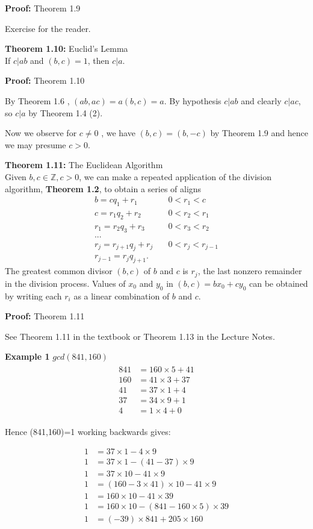 \documentclass[a4paper]{article}
\begin{document}
\textbf{Proof:} Theorem 1.9

Exercise for the reader.

\textbf{Theorem 1.10:} Euclid's Lemma\\
If $c|ab$ and $(b,c)=1$, then $c|a$.

\textbf{Proof:} Theorem 1.10

By Theorem 1.6 , $(ab,ac)=a(b,c)=a$. By hypothesis $c|ab$ and clearly $c|ac$, so $c|a$ by Theorem 1.4 (2).

Now we observe for $c\neq 0$ , we have $(b,c)=(b,-c)$ by Theorem 1.9 and hence we may presume $c>0$.

\textbf{Theorem 1.11:} The Euclidean Algorithm\\
Given $b,c\in\mathbb{Z}, c>0$, we can make a repeated application of the division algorithm, \textbf{Theorem 1.2}, to obtain a series of aligns
\begin{align}
b=cq_1+r_1          & \quad0<r_1<c\\
c=r_1q_2+r_2        & \quad0<r_2<r_1\\
r_1=r_2q_3+r_3      & \quad0<r_3<r_2\\
...\\
r_j=r_{j+1}q_j+r_j  & \quad0<r_j<r_{j-1}\\
r_{j-1}=r_jq_{j+1}.
\end{align}
The greatest common divisor $(b,c)$ of $b$ and $c$ is $r_j$, the last nonzero remainder in the division process. Values of $x_0$ and $y_0$ in $(b,c)=bx_0+cy_0$ can be obtained by writing each $r_i$ as a linear combination of $b$ and $c$.

\textbf{Proof:} Theorem 1.11

See Theorem 1.11 in the textbook or Theorem 1.13 in the Lecture Notes.


\textbf{Example 1}
$gcd(841,160)$
\begin{align}
\begin{split}
841&=160\times5 + 41 \\
160&=41\times3 + 37 \\
41&=37\times 1 + 4 \\
37&=34\times 9 + 1 \\
4&=1\times 4 + 0
\end{split}
\end{align}

Hence (841,160)=1 working backwards gives:


\begin{align}
1&=37\times1 - 4\times9 \\
1&=37\times1 - (41-37)\times9 \\
1&=37\times10 - 41\times9 \\
1&=(160-3\times41)\times10 - 41 \times 9 \\
1&=160\times10 - 41\times39 \\
1&=160\times10 - (841-160\times5)\times39 \\
1&=(-39)\times841 + 205\times160
\end{align}
\end{document}
